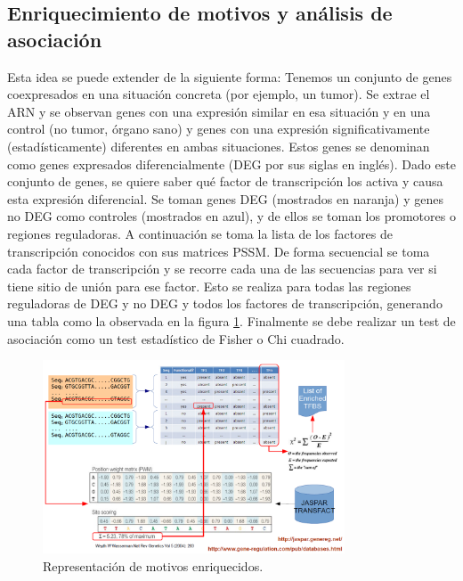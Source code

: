 \subsection{Enriquecimiento de motivos y análisis de asociación}
Esta idea se puede extender de la siguiente forma: Tenemos un conjunto de genes coexpresados en una situación concreta (por ejemplo, un tumor). Se extrae el ARN y se observan genes con una expresión similar en esa situación y en una control (no tumor, órgano sano) y genes con una expresión significativamente (estadísticamente) diferentes en ambas situaciones. Estos genes se denominan como genes expresados diferencialmente (DEG por sus siglas en inglés).
Dado este conjunto de genes, se quiere saber qué factor de transcripción los activa y causa esta expresión diferencial. Se toman genes DEG (mostrados en naranja) y genes no DEG como controles (mostrados en azul), y de ellos se toman los promotores o regiones reguladoras. A continuación se toma la lista de los factores de transcripción conocidos con sus matrices PSSM. De forma secuencial se toma cada factor de transcripción y se recorre cada una de las secuencias para ver si tiene sitio de unión para ese factor. Esto se realiza para todas las regiones reguladoras de DEG y no DEG y todos los factores de transcripción, generando una tabla como la observada en la figura \ref{fig:enrichment}. 
Finalmente se debe realizar un test de asociación como un test estadístico de Fisher o Chi cuadrado. 

\begin{figure}[htbp]
\centering
\includegraphics[width = 0.8\textwidth]{figs/motivos-enriquecidos.png}
\caption{Representación de motivos enriquecidos.}
\label{fig:enrichment}
\end{figure}

